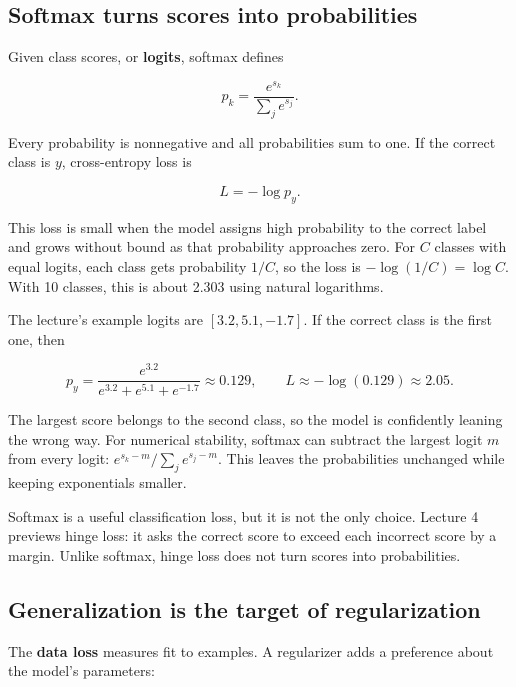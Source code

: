 \subsection{Softmax turns scores into probabilities}\label{04-visual-computing-ii-ch031-softmax-turns-scores-into-probabilities}

\hypertarget{04-visual-computing-ii-ch031-softmax-turns-scores-into-probabilities}{}

Given class scores, or \textbf{logits}, softmax defines

\[p_k=\frac{e^{s_k}}{\sum_j e^{s_j}}.\]

Every probability is nonnegative and all probabilities sum to one. If the correct class is \(y\), cross-entropy loss is

\[L=-\log p_y.\]

This loss is small when the model assigns high probability to the correct label and grows without bound as that probability approaches zero. For \(C\) classes with equal logits, each class gets probability \(1/C\), so the loss is \(-\log(1/C)=\log C\). With 10 classes, this is about 2.303 using natural logarithms.

The lecture's example logits are \([3.2,5.1,-1.7]\). If the correct class is the first one, then

\[p_y=\frac{e^{3.2}}{e^{3.2}+e^{5.1}+e^{-1.7}}\approx0.129, \qquad L\approx-\log(0.129)\approx2.05.\]

The largest score belongs to the second class, so the model is confidently leaning the wrong way. For numerical stability, softmax can subtract the largest logit \(m\) from every logit: \(e^{s_k-m}/\sum_j e^{s_j-m}\). This leaves the probabilities unchanged while keeping exponentials smaller.

Softmax is a useful classification loss, but it is not the only choice. Lecture 4 previews hinge loss: it asks the correct score to exceed each incorrect score by a margin. Unlike softmax, hinge loss does not turn scores into probabilities.

\subsection{Generalization is the target of regularization}\label{04-visual-computing-ii-ch031-generalization-is-the-target-of-regularization}

\hypertarget{04-visual-computing-ii-ch031-generalization-is-the-target-of-regularization}{}

The \textbf{data loss} measures fit to examples. A regularizer adds a preference about the model's parameters:


